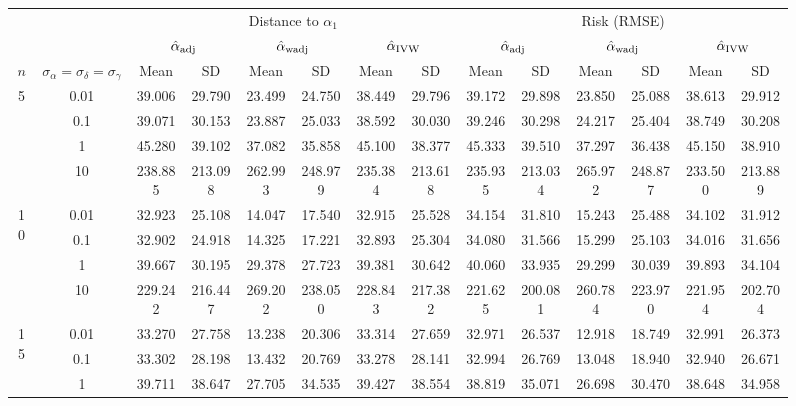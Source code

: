 \documentclass[11pt]{article}
\theoremstyle{definition}
\begin{document}
\begin{sidewaysfigure}
\centering
\centering
\begin{tabular}{cc|cccccc|cccccc}
  && \multicolumn{6}{c|}{Distance to $\alpha_1$}  & \multicolumn{6}{c}{Risk (RMSE)}  \\ 
   & & \multicolumn{2}{c}{$\hat{\alpha}_{\rm adj}$}  & \multicolumn{2}{c}{$\hat{\alpha}_{\rm wadj}$} & \multicolumn{2}{c|}{$\hat{\alpha}_{\rm IVW}$} & \multicolumn{2}{c}{$\hat{\alpha}_{\rm adj}$} & \multicolumn{2}{c}{$\hat{\alpha}_{\rm wadj}$}  & \multicolumn{2}{c}{$\hat{\alpha}_{\rm IVW}$}   \\ 
  $n$   & $\sigma_{\alpha} = \sigma_{\delta}=\sigma_{\gamma}$  & Mean & SD & Mean & SD & Mean & SD & Mean & SD & Mean & SD & Mean & SD  \\ 
    \hline
 \multirow{4}{*}{5}  & 0.01 & 39.006 & 29.790 & 23.499 & 24.750 & 38.449 & 29.796 & 39.172 & 29.898 & 23.850 & 25.088 & 38.613 & 29.912 \\ 
    & 0.1 & 39.071 & 30.153 & 23.887 & 25.033 & 38.592 & 30.030 & 39.246 & 30.298 & 24.217 & 25.404 & 38.749 & 30.208 \\ 
   & 1   & 45.280 & 39.102 & 37.082 & 35.858 & 45.100 & 38.377 & 45.333 & 39.510 & 37.297 & 36.438 & 45.150 & 38.910 \\ 
   & 10   & 238.885 & 213.098 & 262.993 & 248.979 & 235.384 & 213.618 & 235.935 & 213.034 & 265.972 & 248.877 & 233.500 & 213.889 \\ 
\multirow{4}{*}{10}   & 0.01 & 32.923 & 25.108 & 14.047 & 17.540 & 32.915 & 25.528 & 34.154 & 31.810 & 15.243 & 25.488 & 34.102 & 31.912 \\ 
  & 0.1 & 32.902 & 24.918 & 14.325 & 17.221 & 32.893 & 25.304 & 34.080 & 31.566 & 15.299 & 25.103 & 34.016 & 31.656 \\ 
   & 1   & 39.667 & 30.195 & 29.378 & 27.723 & 39.381 & 30.642 & 40.060 & 33.935 & 29.299 & 30.039 & 39.893 & 34.104 \\ 
 & 10   & 229.242 & 216.447 & 269.202 & 238.050 & 228.843 & 217.382 & 221.625 & 200.081 & 260.784 & 223.970 & 221.954 & 202.704 \\ 
\multirow{4}{*}{15}   & 0.01 & 33.270 & 27.758 & 13.238 & 20.306 & 33.314 & 27.659 & 32.971 & 26.537 & 12.918 & 18.749 & 32.991 & 26.373 \\ 
  & 0.1 & 33.302 & 28.198 & 13.432 & 20.769 & 33.278 & 28.141 & 32.994 & 26.769 & 13.048 & 18.940 & 32.940 & 26.671 \\ 
   & 1   & 39.711 & 38.647 & 27.705 & 34.535 & 39.427 & 38.554 & 38.819 & 35.071 & 26.698 & 30.470 & 38.648 & 34.958 \\ 

\end{tabular}
\end{sidewaysfigure}
\end{document}
